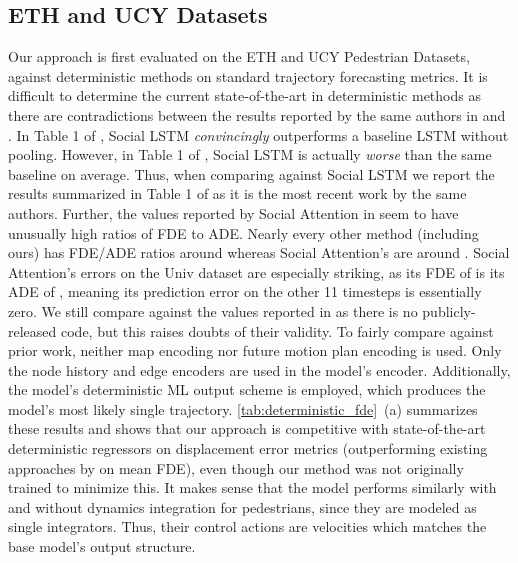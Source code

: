 \documentclass[runningheads]{llncs}
\begin{document}
\subsection{ETH and UCY Datasets}

Our approach is first evaluated on the ETH \cite{PellegriniEssEtAl2009} and UCY \cite{LernerChrysanthouEtAl2007} Pedestrian Datasets, against deterministic methods on standard trajectory forecasting metrics. It is difficult to determine the current state-of-the-art in deterministic methods as there are contradictions between the results reported by the same authors in \cite{GuptaJohnsonEtAl2018} and \cite{AlahiGoelEtAl2016}. In Table 1 of \cite{AlahiGoelEtAl2016}, Social LSTM \textit{convincingly} outperforms a baseline LSTM without pooling. However, in Table 1 of \cite{GuptaJohnsonEtAl2018}, Social LSTM is actually \textit{worse} than the same baseline on average. Thus, when comparing against Social LSTM we report the results summarized in Table 1 of \cite{GuptaJohnsonEtAl2018} as it is the most recent work by the same authors. Further, the values reported by Social Attention in \cite{VemulaMuellingEtAl2018} seem to have unusually high ratios of FDE to ADE.
Nearly every other method (including ours) has FDE/ADE ratios around  whereas Social Attention's are around . Social Attention's errors on the Univ dataset are especially striking, as its FDE of  is  its ADE of , meaning its prediction error on the other 11 timesteps is essentially zero. We still compare against the values reported in \cite{VemulaMuellingEtAl2018} as there is no publicly-released code, but this raises doubts of their validity. To fairly compare against prior work, neither map encoding nor future motion plan encoding is used.
Only the node history and edge encoders are used in the model's encoder. Additionally, the model's deterministic ML output scheme is employed, which produces the model's most likely single trajectory. \cref{tab:deterministic_fde}~(a) summarizes these results and shows that our approach is competitive with state-of-the-art deterministic regressors on displacement error metrics (outperforming existing approaches by  on mean FDE), even though our method was not originally trained to minimize this.
It makes sense that the model performs similarly with and without dynamics integration for pedestrians, since they are modeled as single integrators. Thus, their control actions are velocities which matches the base model's output structure.
\end{document}
